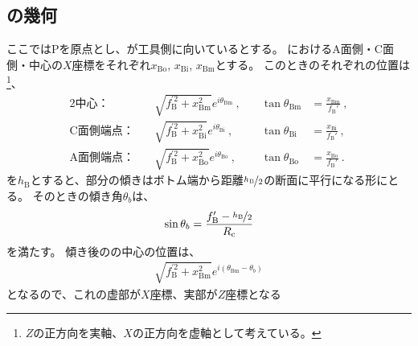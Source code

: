 \subsection{\BottomCurvedOutcut の幾何}
ここでは\TableCenter Pを原点とし、\BottomEndFace が工具側に向いているとする。
\BottomEndFace におけるA面側・C面側・中心の$X$座標をそれぞれ$x_\mathrm{Bo}$, $x_\mathrm{Bi}$, $x_\mathrm{Bm}$とする。
このとき\BottomEndFace のそれぞれの位置は
\footnote{$Z$の正方向を実軸、$X$の正方向を虚軸として考えている。}、
\begin{alignat*}{2}
  \text{中心：}&\quad
  \sqrt{f_\mathrm B^{'2}+x_\mathrm{Bm}^2}e^{i\theta_\mathrm{Bm}}~, \quad &
  \tan\theta_\mathrm{Bm} &= \frac{x_\mathrm{Bm}}{f_\mathrm B'}\ ,\\
  \text{C面側端点：}&\quad
  \sqrt{f_\mathrm B^{'2}+x_\mathrm{Bi}^2}e^{i\theta_\mathrm{Bi}}~, \quad &
  \tan\theta_\mathrm{Bi} &= \frac{x_\mathrm{Bi}}{f_\mathrm B'}\ ,\\
  \text{A面側端点：}&\quad
  \sqrt{f_\mathrm B^{'2}+x_\mathrm{Bo}^2}e^{i\theta_\mathrm{Bo}}~, \quad &
  \tan\theta_\mathrm{Bo} &= \frac{x_\mathrm{Bo}}{f_\mathrm B'}\ .
\end{alignat*}
\BottomOutcutLength を$h_\mathrm B$とすると、\nameCurvedOutcut 部分の傾きはボトム端から距離$\nicefrac{h_\mathrm B}2$の断面に平行になる形にとる。
そのときの傾き角$\theta_b$は、
\begin{align*}
  \sin\theta_b = \frac{f_\mathrm B'-\nicefrac{h_\mathrm B}2}{R_\mathrm c}
\end{align*}
を満たす。
傾き後の\nameBottomEndFace の中心の位置は、
\begin{align}
  \label{eq:BCurvedOutcutAngle}
  \sqrt{f_\mathrm B^{'2}+x_\mathrm{Bm}^2}e^{i(\theta_\mathrm{Bm}-\theta_b)}
\end{align}
となるので、これの虚部が$X$座標、実部が$Z$座標となる
